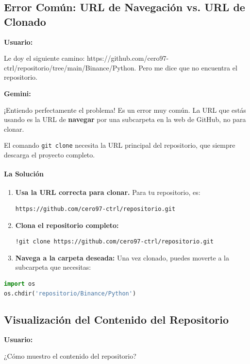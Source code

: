 \documentclass[12pt, a4paper]{article}
\newenvironment{usuario}{\par\noindent\textbf{Usuario:}\itshape\par\ignorespaces}{\par}
\newenvironment{gemini}{\par\noindent\textbf{Gemini:}\par\ignorespaces}{\par}
\begin{document}
\subsection{Error Común: URL de Navegación vs. URL de Clonado}

\begin{usuario}
Le doy el siguiente camino: 
https://github.com/cero97-ctrl/repositorio/tree/main/Binance/Python. 
Pero me dice que no encuentra el repositorio.
\end{usuario}


\begin{gemini}
¡Entiendo perfectamente el problema! Es un error muy común. La 
URL que estás usando es la URL de \textbf{navegar} por una 
subcarpeta en la web de GitHub, no para clonar.

El comando \texttt{git clone} necesita la URL principal del 
repositorio, que siempre descarga el proyecto completo.

\paragraph{La Solución}
\begin{enumerate}
    \item \textbf{Usa la URL correcta para clonar.} Para tu repositorio, es:
    \begin{lstlisting}[language=bash]
https://github.com/cero97-ctrl/repositorio.git
    \end{lstlisting}
    \item \textbf{Clona el repositorio completo:}
    \begin{lstlisting}[language=bash]
!git clone https://github.com/cero97-ctrl/repositorio.git
    \end{lstlisting}
    \item \textbf{Navega a la carpeta deseada:} Una vez clonado, puedes moverte a la 
    subcarpeta que necesitas:
\end{enumerate}
\begin{lstlisting}[language=Python]
import os
os.chdir('repositorio/Binance/Python')
\end{lstlisting}
\end{gemini}

\subsection{Visualización del Contenido del Repositorio}

\begin{usuario}
¿Cómo muestro el contenido del repositorio?
\end{usuario}
\end{document}
